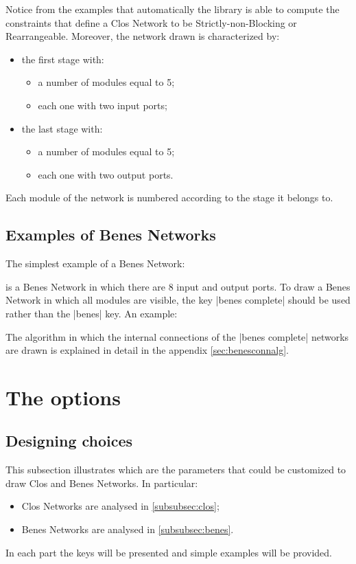 \documentclass{ltxdoc}
\begin{document}
Notice from the examples that automatically the library is able to compute the constraints that define a Clos Network to be Strictly-non-Blocking or Rearrangeable. Moreover, the network drawn is characterized by:
\begin{itemize}
\item the first stage with:
\begin{itemize}
\item a number of modules equal to 5;
\item each one with two input ports;
\end{itemize}
\item the last stage with:
\begin{itemize}
\item a number of modules equal to 5;
\item each one with two output ports.
\end{itemize}
\end{itemize}
Each module of the network is numbered according to the stage it belongs to.

\subsection{Examples of Benes Networks}

The simplest example of a Benes Network:
\begin{codeexample}[]
\begin{tikzpicture}
    \node[benes] {};
\end{tikzpicture}
\end{codeexample}
is a Benes Network in which there are 8 input and output ports. To draw a Benes Network in which all modules are visible, the key |benes complete| should be used rather than the |benes| key. An example:

\begin{codeexample}[]
\end{codeexample}

The algorithm in which the internal connections of the |benes complete| networks are drawn is explained in detail in the appendix \ref{sec:benesconnalg}.

\section{The options}
\subsection{Designing choices}
This subsection illustrates which are the parameters that could be customized to draw Clos and Benes Networks. In particular:
\begin{itemize}
\item Clos Networks are analysed in \ref{subsubsec:clos};
\item Benes Networks are analysed in \ref{subsubsec:benes}.
\end{itemize}
In each part the keys will be presented and simple examples will be provided. 
\end{document}
